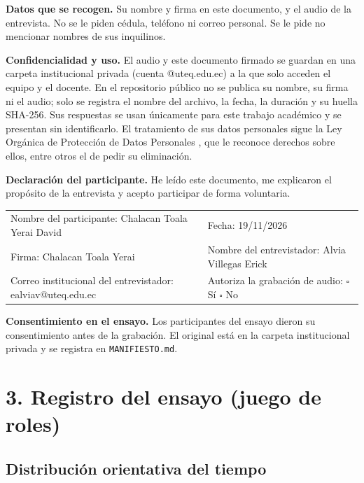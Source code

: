 \documentclass[11pt,a4paper]{article}
\begin{document}
\textbf{Datos que se recogen.} Su nombre y firma en este documento, y el audio de la entrevista. No se le piden cédula, teléfono ni correo personal. Se le pide no mencionar nombres de sus inquilinos.

\textbf{Confidencialidad y uso.} El audio y este documento firmado se guardan en una carpeta institucional privada (cuenta @uteq.edu.ec) a la que solo acceden el equipo y el docente. En el repositorio público no se publica su nombre, su firma ni el audio; solo se registra el nombre del archivo, la fecha, la duración y su huella SHA-256. Sus respuestas se usan únicamente para este trabajo académico y se presentan sin identificarlo. El tratamiento de sus datos personales sigue la Ley Orgánica de Protección de Datos Personales \cite{lopdp2021}, que le reconoce derechos sobre ellos, entre otros el de pedir su eliminación.

\textbf{Declaración del participante.} He leído este documento, me explicaron el propósito de la entrevista y acepto participar de forma voluntaria.

\medskip
\begin{tabularx}{\textwidth}{@{}Y Y@{}}
Nombre del participante: Chalacan Toala Yerai David & Fecha: 19/11/2026 \\[10pt]
Firma: Chalacan Toala Yerai & Nombre del entrevistador: Alvia Villegas Erick \\[10pt]
Correo institucional del entrevistador: ealviav@uteq.edu.ec & Autoriza la grabación de audio: $\square$ Sí \quad $\square$ No \\
\end{tabularx}
\normalsize

\textbf{Consentimiento en el ensayo.} Los participantes del ensayo dieron su consentimiento antes de la grabación. El original está en la carpeta institucional privada y se registra en \texttt{MANIFIESTO.md}.


\clearpage

\section*{3. Registro del ensayo (juego de roles)}
\subsection*{Distribución orientativa del tiempo}

\renewcommand{\arraystretch}{1.18}
\end{document}

